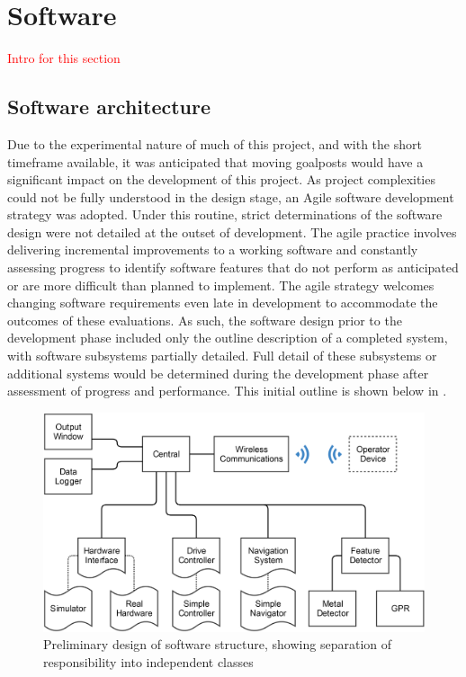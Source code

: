 \documentclass[main.tex]{subfiles}
\begin{document}
\section{Software}
\textcolor{red}{Intro for this section}

\subsection{Software architecture}
Due to the experimental nature of much of this project, and with the short timeframe available, it was anticipated that moving goalposts would have a significant impact on the development of this project. As project complexities could not be fully understood in the design stage, an Agile software development strategy was adopted. Under this routine, strict determinations of the software design were not detailed at the outset of development. The agile practice involves delivering incremental improvements to a working software and constantly assessing progress to identify software features that do not perform as anticipated or are more difficult than planned to implement. The agile strategy welcomes changing software requirements even late in development to accommodate the outcomes of these evaluations.
As such, the software design prior to the development phase included only the outline description of a completed system, with software subsystems partially detailed. Full detail of these subsystems or additional systems would be determined during the development phase after assessment of progress and performance. This initial outline is shown below in .

\begin{figure}[!ht]
\includegraphics[width=1\textwidth]{4-DetailedDesign/fyp_structure__1_.png}
\centering
\caption[Preliminary software structure design]{Preliminary design of software structure, showing separation of responsibility into independent classes} 
\end{figure}
\end{document}
